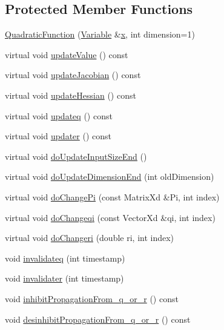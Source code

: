 \subsection*{Protected Member Functions}
\begin{DoxyCompactItemize}
\item 
\hyperlink{classocra_1_1QuadraticFunction_ac5792908a2b7cfdaf612c1e809100a5e}{Quadratic\+Function} (\hyperlink{classocra_1_1Variable}{Variable} \&\hyperlink{classocra_1_1Function_a28825886d1f149c87b112ec2ec1dd486}{x}, int dimension=1)
\item 
virtual void \hyperlink{classocra_1_1QuadraticFunction_a9f62bfdd73ba6ca54c051e1b9394c58c}{update\+Value} () const 
\item 
virtual void \hyperlink{classocra_1_1QuadraticFunction_a95b58f8432eaa625ce0fd8c582706393}{update\+Jacobian} () const 
\item 
virtual void \hyperlink{classocra_1_1QuadraticFunction_ae6c1cd5bc79b757682e25900fa7e2644}{update\+Hessian} () const 
\item 
virtual void \hyperlink{classocra_1_1QuadraticFunction_a76aea91df19ddb128580c24600b72f5b}{updateq} () const 
\item 
virtual void \hyperlink{classocra_1_1QuadraticFunction_abf9f6f0531503a6a466aaa092d3dbece}{updater} () const 
\item 
virtual void \hyperlink{classocra_1_1QuadraticFunction_ab3d5478fd8ded343453e0489c595e580}{do\+Update\+Input\+Size\+End} ()
\item 
virtual void \hyperlink{classocra_1_1QuadraticFunction_ad9b92a56e1c91c33630a5ba3f118c7b9}{do\+Update\+Dimension\+End} (int old\+Dimension)
\item 
virtual void \hyperlink{classocra_1_1QuadraticFunction_a30d2c2217918164d24aaeadde5698d03}{do\+Change\+Pi} (const Matrix\+Xd \&Pi, int index)
\item 
virtual void \hyperlink{classocra_1_1QuadraticFunction_abced87346b20e5ed323b966626487f16}{do\+Changeqi} (const Vector\+Xd \&qi, int index)
\item 
virtual void \hyperlink{classocra_1_1QuadraticFunction_aeaeed88d4fef66c5db465f2887320e37}{do\+Changeri} (double ri, int index)
\item 
void \hyperlink{classocra_1_1QuadraticFunction_ab98c6562b88ef393f03ea0d1c9863f0e}{invalidateq} (int timestamp)
\item 
void \hyperlink{classocra_1_1QuadraticFunction_a3d76d4ae8dc9ffbefcdf7027e72665c4}{invalidater} (int timestamp)
\end{DoxyCompactItemize}
{\bf }\par
\begin{DoxyCompactItemize}
\item 
void \hyperlink{classocra_1_1QuadraticFunction_a18a6744d9a878c548cf8704bbb3223fb}{inhibit\+Propagation\+From\+\_\+q\+\_\+or\+\_\+r} () const 
\item 
void \hyperlink{classocra_1_1QuadraticFunction_a44ce44c40798c848d32734d55301d60c}{desinhibit\+Propagation\+From\+\_\+q\+\_\+or\+\_\+r} () const 
\end{DoxyCompactItemize}

